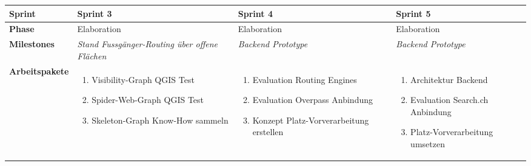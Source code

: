 \begin{landscape}
\begin{longtable}{l p{5.5cm} p{5.5cm} p{5.5cm}}
        \pagebreak
        \toprule
        \textbf{Sprint}
                                & \textbf{Sprint 3}
                                & \textbf{Sprint 4}
                                & \textbf{Sprint 5} \\
        
        \midrule
        \textbf{Phase}
                                & Elaboration
                                & Elaboration
                                & Elaboration \\
        
        \textbf{Milestones}
                                & \textit{Stand Fussgänger-Routing über offene Flächen}
                                & \textit{Backend Prototype}
                                & \textit{Backend Prototype}  \\
        
        \textbf{Arbeitspakete}
                                & \begin{enumerate}[noitemsep]
                                    \item Visibility-Graph QGIS Test
                                    \item Spider-Web-Graph QGIS Test
                                    \item Skeleton-Graph Know-How sammeln
                                \end{enumerate}
                                & \begin{enumerate}[noitemsep]
                                    \item Evaluation Routing Engines
                                    \item Evaluation Overpass Anbindung
                                    \item Konzept Platz-Vorverarbeitung erstellen
                                \end{enumerate}
                                & \begin{enumerate}[noitemsep]
                                    \item Architektur Backend
                                    \item Evaluation Search.ch Anbindung
                                    \item Platz-Vorverarbeitung umsetzen
                                \end{enumerate}  \\
        

\end{longtable}
\end{landscape}
